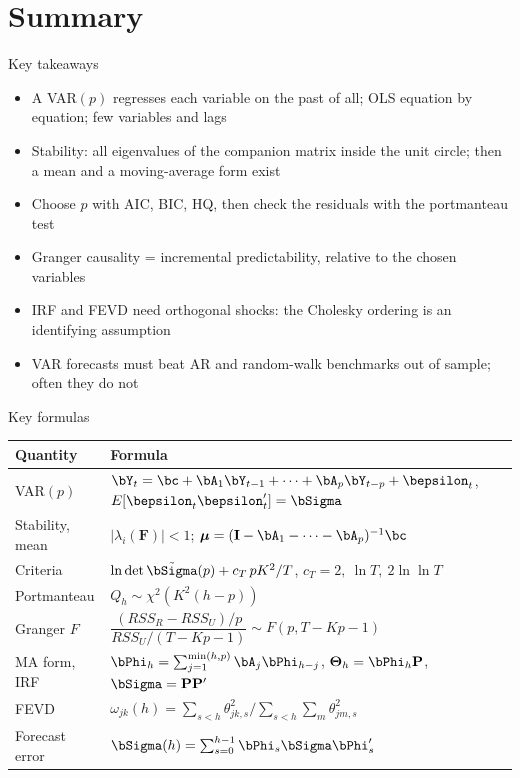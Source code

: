 \section{Summary}

\begin{frame}{Key takeaways}
\itemsize{\small}
\begin{itemize}
    \item A VAR$(p)$ regresses each variable on the past of all; OLS equation by equation; few variables and lags
    \item Stability: all eigenvalues of the companion matrix inside the unit circle; then a mean and a moving-average form exist
    \item Choose $p$ with AIC, BIC, HQ, then check the residuals with the portmanteau test
    \item Granger causality = incremental predictability, relative to the chosen variables
    \item IRF and FEVD need orthogonal shocks: the Cholesky ordering is an identifying assumption
    \item VAR forecasts must beat AR and random-walk benchmarks out of sample; often they do not
\end{itemize}
\end{frame}

\begin{frame}{Key formulas}
\itemsize{\small}
{\renewcommand{\arraystretch}{1.35}\begin{center}
\footnotesize
\begin{tabular}{ll}
\toprule
\textbf{Quantity} & \textbf{Formula} \\
\midrule
VAR$(p)$ & $\bY_t = \bc + \bA_1\bY_{t-1} + \dots + \bA_p\bY_{t-p} + \bepsilon_t$, \quad $E[\bepsilon_t\bepsilon_t'] = \bSigma$ \\
Stability, mean & $|\lambda_i(\mathbf{F})| < 1$; \quad $\boldsymbol{\mu} = (\mathbf{I} - \bA_1 - \dots - \bA_p)^{-1}\bc$ \\
Criteria & $\ln\det\tilde\bSigma(p) + c_T\,pK^2/T$, \quad $c_T = 2,\ \ln T,\ 2\ln\ln T$ \\
Portmanteau & $Q_h \sim \chi^2(K^2(h - p))$ \\
Granger $F$ & $\dfrac{(RSS_R - RSS_U)/p}{RSS_U/(T - Kp - 1)} \sim F(p, T - Kp - 1)$ \\
MA form, IRF & $\bPhi_h = \sum_{j=1}^{\min(h,p)}\bA_j\bPhi_{h-j}$, \quad $\boldsymbol{\Theta}_h = \bPhi_h\mathbf{P}$, \quad $\bSigma = \mathbf{P}\mathbf{P}'$ \\
FEVD & $\omega_{jk}(h) = \sum_{s<h}\theta_{jk,s}^2 / \sum_{s<h}\sum_m\theta_{jm,s}^2$ \\
Forecast error & $\bSigma(h) = \sum_{s=0}^{h-1}\bPhi_s\bSigma\bPhi_s'$ \\
\bottomrule
\end{tabular}
\end{center}
}
\end{frame}

